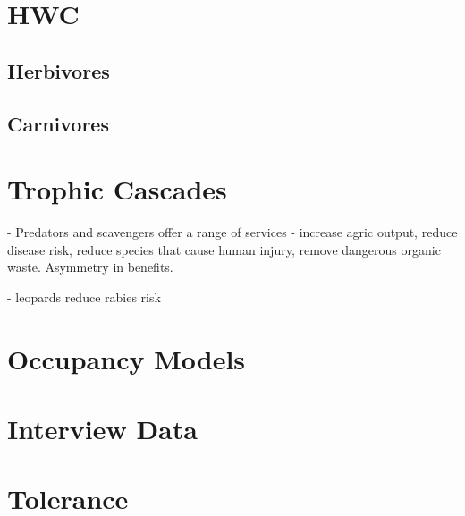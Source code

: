 \section{HWC}

\subsection{Herbivores}

\subsection{Carnivores}

\section{Trophic Cascades}

\cite{O_Bryan_2018} - Predators and scavengers offer a range of services - increase agric output, reduce disease risk, reduce species that cause human injury, remove dangerous organic waste. Asymmetry in benefits.

\cite{Braczkowski_2018} - leopards reduce rabies risk

\section{Occupancy Models}

\section{Interview Data}

\section{Tolerance}
